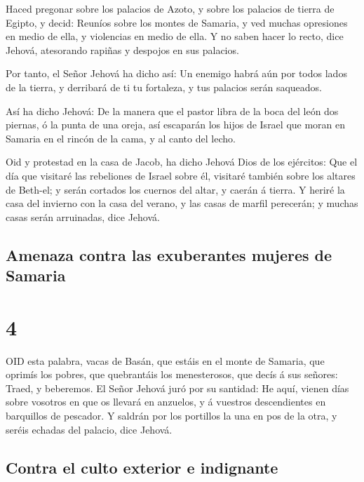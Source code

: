  Haced pregonar sobre los palacios de Azoto, y sobre los
palacios de tierra de Egipto, y decid: Reuníos sobre los montes de
Samaria, y ved muchas opresiones en medio de ella, y violencias en medio
de ella.  Y no saben hacer lo recto, dice Jehová,
atesorando rapiñas y despojos en sus palacios.

 Por tanto, el Señor Jehová ha dicho así: Un enemigo habrá
aún por todos lados de la tierra, y derribará de ti tu fortaleza, y tus
palacios serán saqueados.

 Así ha dicho Jehová: De la manera que el pastor libra de
la boca del león dos piernas, ó la punta de una oreja, así escaparán los
hijos de Israel que moran en Samaria en el rincón de la cama, y al canto
del lecho.

 Oid y protestad en la casa de Jacob, ha dicho Jehová Dios
de los ejércitos:  Que el día que visitaré las rebeliones
de Israel sobre él, visitaré también sobre los altares de Beth-el; y
serán cortados los cuernos del altar, y caerán á tierra.  Y
heriré la casa del invierno con la casa del verano, y las casas de
marfil perecerán; y muchas casas serán arruinadas, dice Jehová.

\hypertarget{amenaza-contra-las-exuberantes-mujeres-de-samaria}{%
\subsection{Amenaza contra las exuberantes mujeres de
Samaria}\label{amenaza-contra-las-exuberantes-mujeres-de-samaria}}

\hypertarget{section-3}{%
\section{4}\label{section-3}}

 OID esta palabra, vacas de Basán, que estáis en el monte de
Samaria, que oprimís los pobres, que quebrantáis los menesterosos, que
decís á sus señores: Traed, y beberemos.  El Señor Jehová
juró por su santidad: He aquí, vienen días sobre vosotros en que os
llevará en anzuelos, y á vuestros descendientes en barquillos de
pescador.  Y saldrán por los portillos la una en pos de la
otra, y seréis echadas del palacio, dice Jehová.

\hypertarget{contra-el-culto-exterior-e-indignante}{%
\subsection{Contra el culto exterior e
indignante}\label{contra-el-culto-exterior-e-indignante}}

